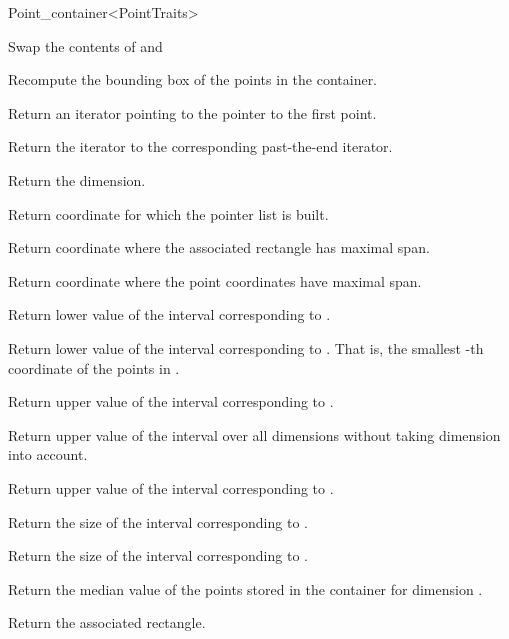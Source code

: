 \begin{ccRefClass}{Point_container<PointTraits>}
\begin{ccAdvanced}
{Swap the contents of  and }


{Recompute the bounding box of the points in the container.}


{
Return an iterator pointing to the pointer to the first point.
}

{
Return the iterator to the corresponding past-the-end iterator.
}

{
Return the dimension.
}

{
Return coordinate for which the pointer list is built.
}

{
Return coordinate where the associated rectangle has maximal span.
}

{
Return coordinate where the point coordinates have maximal span.
}

{
Return lower value of the interval corresponding to
.
}


{
Return lower value of the interval corresponding to
. That is, the smallest
-th coordinate of the points in
.
}


{
Return upper value of the interval corresponding to
.
}

{
Return upper value of the interval over all dimensions
without taking dimension  into account.
}

{
Return upper value of the interval corresponding to
.
}

{
Return the size of the interval corresponding to .
}

{
Return the size of the interval corresponding to .
}

{
Return the median value of the points stored in the container for
dimension .
}

{Return the associated rectangle.}


\end{ccAdvanced}
\end{ccRefClass}
